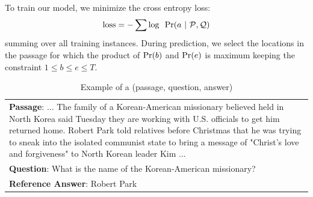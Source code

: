 \documentclass[letterpaper]{article} %
\begin{document}
To train our model, we minimize the cross entropy loss:
\begin{equation}
\textnormal{loss} = - \sum \textnormal{log} ~~ \textnormal{Pr}(a ~|~ \mathcal{P},\mathcal{Q})
\end{equation}
summing over all training instances. During prediction, we select the locations in the passage for which the product of $\textnormal{Pr}(b)$ and $\textnormal{Pr}(e)$ is maximum keeping the constraint $1 \leq b \leq e \leq T$.
\begin{table}[t]
\centering
\begin{tabular}{|p{8.0cm}|}
\hline
\textbf{Passage}: ... The family of a Korean-American missionary believed held in North Korea said Tuesday they are working with U.S. officials to get him returned home. Robert Park told relatives before Christmas that he was trying to sneak into the isolated communist state to bring a message of "Christ's love and forgiveness" to North Korean leader Kim ... \\
\textbf{Question}: What is the name of the Korean-American missionary? \\
\textbf{Reference Answer}: Robert Park \\ \hline
\end{tabular}
\caption{Example of a (passage, question, answer)}
\label{tab:ex2}
\end{table}
\end{document}
